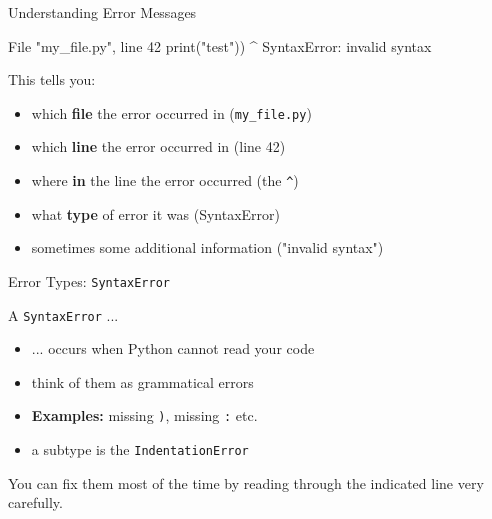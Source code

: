\begin{frame}[fragile]{Understanding Error Messages}

    \begin{alertblock}{}
        \begin{outputcode}
      File "my_file.py", line 42
        print("test"))
                     ^
    SyntaxError: invalid syntax
        \end{outputcode}
    \end{alertblock}

    This tells you:

    \begin{itemize}
        \item which \textbf{file} the error occurred in (\texttt{my\_file.py})
        \item which \textbf{line} the error occurred in (line 42)
        \item where \textbf{in} the line the error occurred (the \texttt{\^})
        \item what \textbf{type} of error it was (SyntaxError)
        \item sometimes some additional information ("invalid syntax")
    \end{itemize}


\end{frame}

\begin{frame}{Error Types: \texttt{SyntaxError}}

    A \texttt{SyntaxError} ...

    \begin{itemize}
        \item ... occurs when Python cannot read your code
        \item think of them as grammatical errors
        \item \textbf{Examples:} missing \texttt{)}, missing \texttt{:} etc.
        \item a subtype is the \texttt{IndentationError}
    \end{itemize}

    You can fix them most of the time by reading through the indicated line very carefully.

\end{frame}

